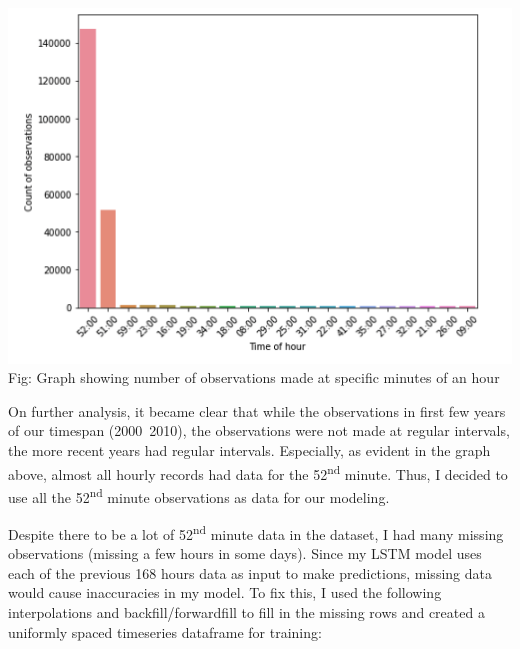 \documentclass[paper=a4, fontsize=11pt, margin=1in]{scrartcl}
\numberwithin{equation}{section}		%
\numberwithin{figure}{section}			%
\numberwithin{table}{section}				%
\begin{document}
\begin{center}
\includegraphics[width=1\textwidth,height=0.5\textheight]{time-of-hour.png}\\
Fig: Graph showing number of observations made at specific minutes of an hour
\end{center}

On further analysis, it became clear that while the observations in first few years of our timespan (2000~2010), the observations were not made at regular intervals, the more recent years had regular intervals. Especially, as evident in the graph above, almost all hourly records had data for the 52\textsuperscript{nd} minute. Thus, I decided to use all the 52\textsuperscript{nd} minute observations as data for our modeling. 

Despite there to be a lot of 52\textsuperscript{nd} minute data in the dataset, I had many missing observations (missing a few hours in some days). Since my LSTM model uses each of the previous 168 hours data as input to make predictions, missing data would cause inaccuracies in my model. To fix this, I used the following interpolations and backfill/forwardfill to fill in the missing rows and created a uniformly spaced timeseries dataframe for training: 
\end{document}
